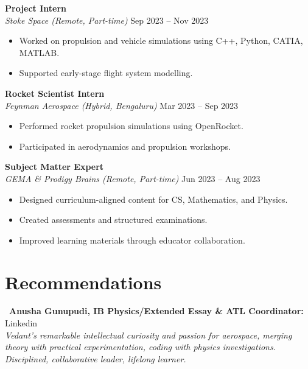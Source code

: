 \documentclass[a4paper,10pt]{article}
\begin{document}
\textbf{Project Intern}\\
\emph{Stoke Space (Remote, Part-time)} \hfill Sep 2023 -- Nov 2023
\begin{itemize}[leftmargin=*]
    \item Worked on propulsion and vehicle simulations using C++, Python, CATIA, MATLAB.
    \item Supported early-stage flight system modelling.
\end{itemize}

\textbf{Rocket Scientist Intern}\\
\emph{Feynman Aerospace (Hybrid, Bengaluru)} \hfill Mar 2023 -- Sep 2023
\begin{itemize}[leftmargin=*]
    \item Performed rocket propulsion simulations using OpenRocket.
    \item Participated in aerodynamics and propulsion workshops.
\end{itemize}

\textbf{Subject Matter Expert}\\
\emph{GEMA \& Prodigy Brains (Remote, Part-time)} \hfill Jun 2023 -- Aug 2023
\begin{itemize}[leftmargin=*]
    \item Designed curriculum-aligned content for CS, Mathematics, and Physics.
    \item Created assessments and structured examinations.
    \item Improved learning materials through educator collaboration.
\end{itemize}



\section*{\color{accent} Recommendations}
\faQuoteLeft~\textbf{Anusha Gunupudi, IB Physics/Extended Essay \& ATL Coordinator:} Linkedin \href{https://www.linkedin.com/in/vedantpatnaik/details/recommendations/#:~:text=Anusha%20Gunupudi,anushagunupudis%40gmail.com}{\faExternalLink}\\
\emph{Vedant's remarkable intellectual curiosity and passion for aerospace, merging theory with practical experimentation, coding with physics investigations. Disciplined, collaborative leader, lifelong learner.}
\end{document}
